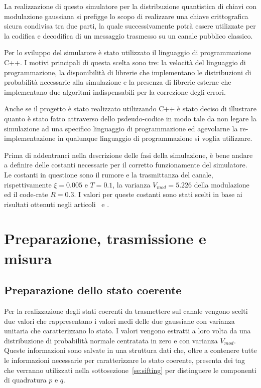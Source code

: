 La realizzazione di questo simulatore per la distribuzione quantistica di chiavi con modulazione gaussiana si prefigge lo scopo di realizzare una chiave crittografica sicura condivisa tra due parti, la quale successivamente potr\`a essere utilizzate per la codifica e decodifica di un messaggio trasmesso su un canale pubblico classico. 

Per lo sviluppo del simularore \`e stato utilizzato il linguaggio di programmazione C++. I motivi principali di questa scelta sono tre: la velocit\`a del linguaggio di programmazione, la disponibilit\`a di librerie che implementano le distribuzioni di probabilit\`a necessarie alla simulazione e la presenza di librerie esterne che implementano due algoritmi indispensabili per la correzione degli errori.

Anche se il progetto \`e stato realizzato utilizzando C++ \`e stato deciso di illustrare quanto \`e stato fatto attraverso dello psdeudo-codice in modo tale da non legare la simulazione ad una specifico linguaggio di programmazione ed agevolarne la re-implementazione in qualunque linguaggio di programmazione si voglia utilizzare.

Prima di addentranci nella descrizione delle fasi della simulazione, \`e bene andare a definire delle costanti necessarie per il corretto funzionamente del simulatore. Le costanti in questione sono il rumore e la trasmittanza del canale, rispettivamente $\xi = 0.005$ e $T=0.1$, la varianza $V_{mod}=5.226$ della modulazione ed il code-rate $R = 0.3$. I valori per queste costanti sono stati scelti in base ai risultati ottenuti negli articoli~\cite{https://doi.org/10.1002/qute.201800011} e \cite{e24101463}.

\section{Preparazione, trasmissione e misura}

\subsection{Preparazione dello stato coerente}\label{subse:prep-stato}
Per la realizzazione degli stati coerenti da trasmettere sul canale vengono scelti due valori che rappresentano i valori medi delle due gaussiane con varianza unitaria che caratterizzano lo stato. I valori vengono estratti a loro volta da una distribuzione di probabilit\`a normale centratata in zero e con varianza $V_{mod}$. Queste informazioni sono salvate in una struttura dati che, oltre a contenere tutte le informazioni necessarie per caratterizzare lo stato coerente, presenta dei tag che verranno utilizzati nella sottosezione~\ref{se:sifting} per distinguere le componenti di quadratura $p$ e $q$.

